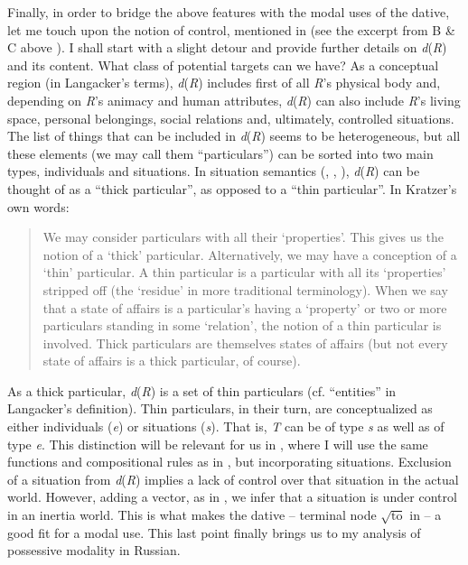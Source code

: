 \documentclass[output=paper,colorlinks,citecolor=brown,nonflat]{./langscibook}
\begin{document}
Finally, in order to bridge the above features with the modal uses of the dative, let me touch upon the notion of control, mentioned in  (see the excerpt from B \& C above ). I shall start with a slight detour and provide further details on \textit{d}(\textit{R}) and its content. What class of potential targets can we have? As a conceptual region (in Langacker’s terms), \textit{d}(\textit{R}) includes first of all \textit{R}’s physical body and, depending on \textit{R}’s animacy and human attributes, \textit{d}(\textit{R}) can also include \textit{R}’s living space, personal belongings, social relations and, ultimately, controlled situations. The list of things that can be included in \textit{d}(\textit{R}) seems to be heterogeneous, but all these elements (we may call them “particulars”) can be sorted into two main types, individuals and situations. In situation semantics (\citealt{Kratzer1989}, \citeyear{Kratzer2002}, \citeyear{Kratzer2019}), \textit{d}(\textit{R}) can be thought of as a “thick particular”, as opposed to a “thin particular”. In Kratzer’s own words: 
\begin{quote}
We may consider particulars with all their ‘properties’. This gives us the notion of a ‘thick’ particular. Alternatively, we may have a conception of a ‘thin’ particular. A thin particular is a particular with all its ‘properties’ stripped off (the ‘residue’ in more traditional terminology). When we say that a state of affairs is a particular’s having a ‘property’ or two or more particulars standing in some ‘relation’, the notion of a thin particular is involved. Thick particulars are themselves states of affairs (but not every state of affairs is a thick particular, of course). \hfill \citep[613]{Kratzer1989} 
\end{quote}

As a thick particular, \textit{d}(\textit{R}) is a set of thin particulars (cf. “entities” in Langacker’s definition). Thin particulars, in their turn, are conceptualized as either individuals (\textit{e}) or situations (\textit{s}). That is, \textit{T} can be of type \textit{s} as well as of type \textit{e}. This distinction will be relevant for us in , where I will use the same functions and compositional rules as in , but incorporating situations. Exclusion of a situation from \textit{d}(\textit{R}) implies a lack of control over that situation in the actual world. However, adding a vector, as in , we infer that a situation is under control in an inertia world. This is what makes the dative – terminal node  $\sqrt{\text{to}}$  in  – a good fit for a modal use. This last point finally brings us to my analysis of possessive modality in Russian.
\end{document}
